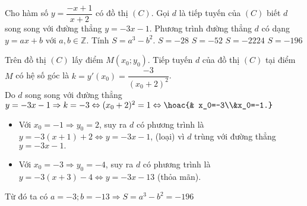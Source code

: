 \begin{ex}%
	Cho hàm số $y=\dfrac{-x+1}{x+2}$ có đồ thị $(C)$. Gọi $d$ là tiếp tuyến của $(C)$ biết $d$ song song với đường thẳng $y=-3x-1$. Phương trình đường thẳng $d$ có dạng $y=ax+b$ với $a,b \in \mathbb{Z}$. Tính $S=a^3-b^2$.
		\choice
	{$S=-28$}
	{$S=-52$}
	{$S=-2224$}
	{\True $S= -196$}
	\loigiai
	{ Trên đồ thị $(C)$ lấy điểm $M(x_0;y_0)$. Tiếp tuyến $d$ của đồ thị $(C)$ tại điểm $M$ có hệ số góc là $k=y'(x_0)= \dfrac{-3}{(x_0+2)^2}$.\\
	Do $d$ song song với đường thẳng $y=-3x-1 \Rightarrow k=-3 \Leftrightarrow (x_0+2)^2=1 \Leftrightarrow \hoac {& x_0=-3\\&x_0=-1.}$\\
			\begin{itemize}
			\item Với $x_0=-1 \Rightarrow y_0 =2$, suy ra $d$ có phương trình là $y=-3(x+1)+2 \Leftrightarrow y=-3x-1$, (loại) vì $d$ trùng với đường thẳng $y=-3x-1.$
			\item Với $x_0=-3 \Rightarrow y_0=-4$, suy ra $d$ có phương trình là $y=-3(x+3)-4 \Leftrightarrow y=-3x-13$ (thỏa mãn).		
		\end{itemize}
		Từ đó ta có $a=-3; b=-13\Rightarrow S=a^3-b^2 =-196$
	}
\end{ex}

